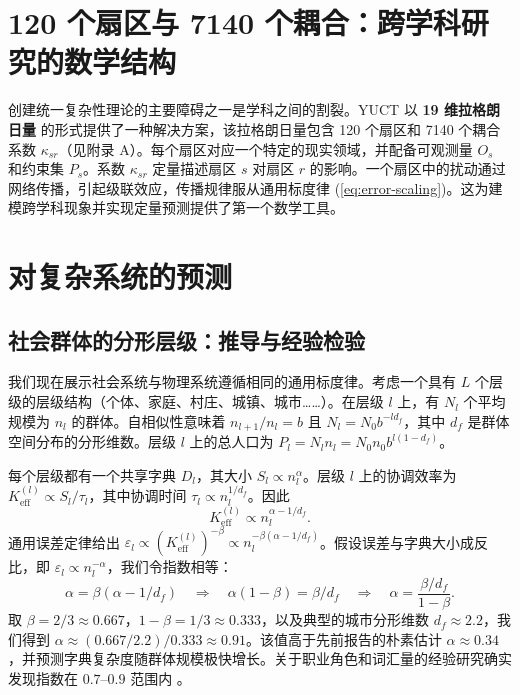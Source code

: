 \documentclass[11pt]{article}
\theoremstyle{remark}
\newcommand{\Keff}{K_{\mathrm{eff}}}
\begin{document}
	\section{120 个扇区与 7140 个耦合：跨学科研究的数学结构}
	\label{sec:sectors}
	
	创建统一复杂性理论的主要障碍之一是学科之间的割裂。YUCT 以 \textbf{19 维拉格朗日量} 的形式提供了一种解决方案，该拉格朗日量包含 120 个扇区和 7140 个耦合系数 \(\kappa_{sr}\)（见附录 A）。每个扇区对应一个特定的现实领域，并配备可观测量 \(O_s\) 和约束集 \(P_s\)。系数 \(\kappa_{sr}\) 定量描述扇区 \(s\) 对扇区 \(r\) 的影响。一个扇区中的扰动通过网络传播，引起级联效应，传播规律服从通用标度律 (\ref{eq:error-scaling})。这为建模跨学科现象并实现定量预测提供了第一个数学工具。
	
	\section{对复杂系统的预测}
	\label{sec:predictions}
	
	\subsection{社会群体的分形层级：推导与经验检验}
	\label{sec:social_scaling}
	
	我们现在展示社会系统与物理系统遵循相同的通用标度律。考虑一个具有 \(L\) 个层级的层级结构（个体、家庭、村庄、城镇、城市……）。在层级 \(l\) 上，有 \(N_l\) 个平均规模为 \(n_l\) 的群体。自相似性意味着 \(n_{l+1}/n_l = b\) 且 \(N_l = N_0 b^{-l d_f}\)，其中 \(d_f\) 是群体空间分布的分形维数。层级 \(l\) 上的总人口为 \(P_l = N_l n_l = N_0 n_0 b^{l(1-d_f)}\)。
	
	每个层级都有一个共享字典 \(D_l\)，其大小 \(S_l \propto n_l^{\alpha}\)。层级 \(l\) 上的协调效率为 \(\Keff^{(l)} \propto S_l / \tau_l\)，其中协调时间 \(\tau_l \propto n_l^{1/d_f}\)。因此
	\begin{equation}
		\Keff^{(l)} \propto n_l^{\alpha - 1/d_f}. \tag{1}
	\end{equation}
	通用误差定律给出 \(\varepsilon_l \propto (\Keff^{(l)})^{-\beta} \propto n_l^{-\beta(\alpha - 1/d_f)}\)。假设误差与字典大小成反比，即 \(\varepsilon_l \propto n_l^{-\alpha}\)，我们令指数相等：
	\begin{equation}
		\alpha = \beta(\alpha - 1/d_f) \quad\Longrightarrow\quad \alpha(1-\beta) = \beta / d_f \quad\Longrightarrow\quad \alpha = \frac{\beta / d_f}{1-\beta}.
	\end{equation}
	取 \(\beta = 2/3 \approx 0.667\)，\(1-\beta = 1/3 \approx 0.333\)，以及典型的城市分形维数 \(d_f \approx 2.2\)，我们得到 \(\alpha \approx (0.667/2.2)/0.333 \approx 0.91\)。该值高于先前报告的朴素估计 \(\alpha \approx 0.34\)，并预测字典复杂度随群体规模极快增长。关于职业角色和词汇量的经验研究确实发现指数在 \(0.7\)–\(0.9\) 范围内 \cite{Bettencourt2007, Molinero2024}。
	
\end{document}
